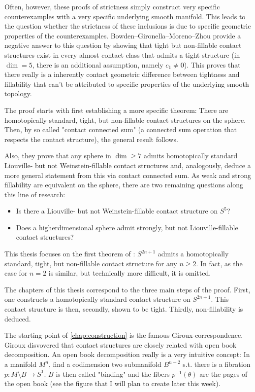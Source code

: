 Often, however, these proofs of strictness simply construct very specific counterexamples with a very specific underlying smooth manifold.
This leads to the question whether the strictness of these inclusions is due to specific geometric properties of the counterexamples.
Bowden--Gironella--Moreno--Zhou \cite{BGMZ22} provide a negative answer to this question by showing that tight but
non-fillable contact structures exist in every almost contact class that admits a tight structure (in $\dim = 5$, there is an additional assumption, namely $c_1\neq 0$).
This proves that there really is a inherently contact geometric difference between tightness and fillability
that can't be attributed to specific properties of the underlying smooth topology.

The proof starts with first establishing a more specific theorem: There are homotopically standard, tight, but non-fillable contact structures on the sphere.
Then, by so called "contact connected sum" (a connected sum operation that respects the contact structure),
the general result follows.

Also, they prove that any sphere in $\dim \geq 7$ admits homotopically standard Liouville- but not Weinstein-fillable contact structures
and, analogously, deduce a more general statement from this via contact connected sum.
As weak and strong fillability are equivalent on the sphere, there are two remaining questions along this line of research:
\begin{itemize}
    \item Is there a Liouville- but not Weinstein-fillable contact structure on $S^5$?
    \item Does a higherdimensional sphere admit strongly, but not Liouville-fillable contact structures?
\end{itemize}

This thesis focuses on the first theorem of \cite{BGMZ22}: $S^{2n+1}$ admits a homotopically standard, tight, but non-fillable contact structure
for any $n \geq 2$. In fact, as the case for $n = 2$ is similar, but technically more difficult, it is omitted.

The chapters of this thesis correspond to the three main steps of the proof. First, one constructs a homotopically standard contact structure on $S^{2n+1}$.
This contact structure is then, secondly, shown to be tight.
Thirdly, non-fillability is deduced.

The starting point of \cref{chap:construction} is the famous Giroux-correspondence.
Giroux disvovered that contact structures are closely related with open book decomposition.
An open book decomposition really is a very intuitive concept: In a manifold $M^n$, find a codimension two submanifold $B^{n-2}$
s.t. there is a fibration $p\colon M\setminus B \to S^1$. $B$ is then called "binding" and the fibers $p^{-1}(\theta)$ are the pages of the open book
(see the figure that I will plan to create later this week).

